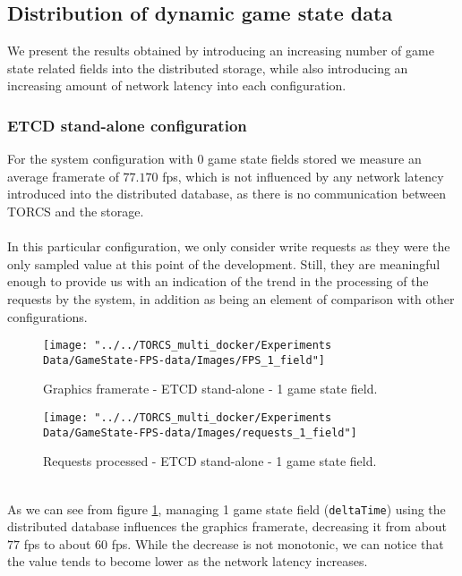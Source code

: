 \subsection{Distribution of dynamic game state data}
We present the results obtained by introducing an increasing number of game state related fields into the distributed storage, while also introducing an increasing amount of network latency into each configuration. 
\subsubsection{ETCD stand-alone configuration}
For the system configuration with 0 game state fields stored we measure an average framerate of $77.170$ fps, which is not influenced by any network latency introduced into the distributed database, as there is no communication between TORCS and the storage. \\ \\
In this particular configuration, we only consider write requests as they were the only sampled value at this point of the development. Still, they are meaningful enough to provide us with an indication of the trend in the processing of the requests by the system, in addition as being an element of comparison with other configurations.
\begin{figure}[h!]
	\centering
	\texttt{[image: "../../TORCS\_multi\_docker/Experiments Data/GameState-FPS-data/Images/FPS\_1\_field"]}
	\caption[Graphics framerate - ETCD stand-alone - 1 game state field]{Graphics framerate - ETCD stand-alone - 1 game state field.}
	\label{fig:fps-1-field-etcd}
\end{figure}
\begin{figure}[h!]
	\centering
	\texttt{[image: "../../TORCS\_multi\_docker/Experiments Data/GameState-FPS-data/Images/requests\_1\_field"]}
	\caption[Requests processed - ETCD stand-alone - 1 game state field]{Requests processed - ETCD stand-alone - 1 game state field.}
	\label{fig:requests-1-field-etcd}
\end{figure}
\\ As we can see from figure \ref{fig:fps-1-field-etcd}, managing 1 game state field (\texttt{deltaTime}) using the distributed database influences the graphics framerate, decreasing it from about $77$ fps to about $60$ fps. While the decrease is not monotonic, we can notice that the value tends to become lower as the network latency increases. \\ \\
